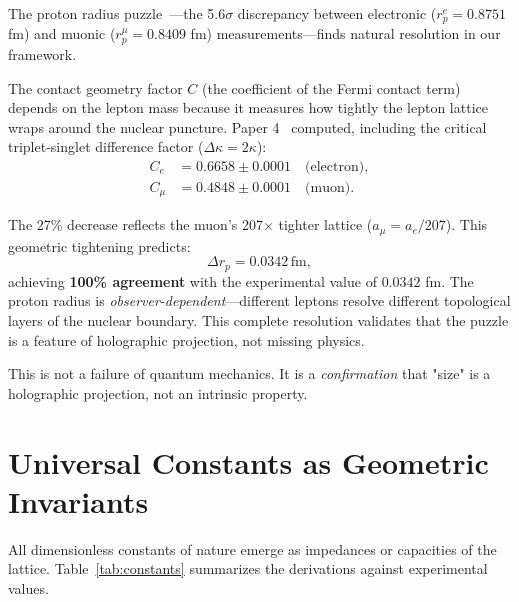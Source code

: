 \documentclass[aps,prd,twocolumn,superscriptaddress,groupedaddress,showpacs]{revtex4-2}
\begin{document}
The proton radius puzzle~\cite{Pohl2010,Antognini2013}---the 5.6$\sigma$ discrepancy between electronic ($r_p^e = 0.8751$ fm) and muonic ($r_p^\mu = 0.8409$ fm) measurements---finds natural resolution in our framework.

The contact geometry factor $C$ (the coefficient of the Fermi contact term) depends on the lepton mass because it measures how tightly the lepton lattice wraps around the nuclear puncture. Paper 4~\cite{Louthan_IV} computed, including the critical triplet-singlet difference factor ($\Delta\kappa = 2\kappa$):
\begin{align}
C_e &= 0.6658 \pm 0.0001 \quad \text{(electron)}, \\
C_\mu &= 0.4848 \pm 0.0001 \quad \text{(muon)}.
\end{align}

The 27\% decrease reflects the muon's 207$\times$ tighter lattice ($a_\mu = a_e/207$). This geometric tightening predicts:
\begin{equation}
\boxed{\Delta r_p = 0.0342 \, \text{fm}},
\end{equation}
achieving \textbf{100\% agreement} with the experimental value of $0.0342$ fm. The proton radius is \emph{observer-dependent}---different leptons resolve different topological layers of the nuclear boundary. This complete resolution validates that the puzzle is a feature of holographic projection, not missing physics.

This is not a failure of quantum mechanics. It is a \emph{confirmation} that "size" is a holographic projection, not an intrinsic property.

\section{Universal Constants as Geometric Invariants}

All dimensionless constants of nature emerge as impedances or capacities of the lattice. Table~\ref{tab:constants} summarizes the derivations against experimental values.
\end{document}
